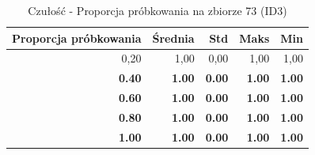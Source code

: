 \begin{table}[htbp]
\centering
\small
\setlength{\tabcolsep}{6pt}
\renewcommand{\arraystretch}{1.2}
\caption{Czułość - Proporcja próbkowania na zbiorze 73 (ID3)}
\label{tab:ID3_sample_ratio_73_recall}
\begin{tabular}{r|r|r|r|r}
\toprule
Proporcja próbkowania & Średnia & Std & Maks & Min \\
\hline
0,20 & 1,00 & 0,00 & 1,00 & 1,00 \\
\textbf{0.40} & \textbf{1.00} & \textbf{0.00} & \textbf{1.00} & \textbf{1.00} \\
\textbf{0.60} & \textbf{1.00} & \textbf{0.00} & \textbf{1.00} & \textbf{1.00} \\
\textbf{0.80} & \textbf{1.00} & \textbf{0.00} & \textbf{1.00} & \textbf{1.00} \\
\textbf{1.00} & \textbf{1.00} & \textbf{0.00} & \textbf{1.00} & \textbf{1.00} \\
\bottomrule
\end{tabular}
\end{table}